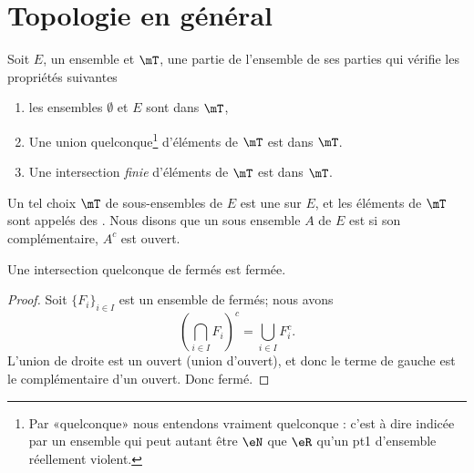 
					\section{Topologie en général}

\begin{definition}		\label{DefTopologieGene}
Soit $E$, un ensemble et $\mT$, une partie de l'ensemble de ses parties qui vérifie les propriétés suivantes
\begin{enumerate}

\item
les ensembles $\emptyset$ et $E$ sont dans $\mT$,

\item
    Une union quelconque\footnote{Par «quelconque» nous entendons vraiment quelconque : c'est à dire indicée par un ensemble qui peut autant être \( \eN\) que \( \eR\) qu'un pt1 d'ensemble réellement violent.} d'éléments de \( \mT\) est dans \( \mT\).
\item
    Une intersection \emph{finie} d'éléments de \( \mT\) est dans \( \mT\).

\end{enumerate}
Un tel choix $\mT$ de sous-ensembles de $E$ est une   sur $E$, et les éléments de $\mT$ sont appelés des . Nous disons que un sous ensemble $A$ de $E$ est  si son complémentaire, $A^c$ est ouvert.
\end{definition}

\begin{lemma}   \label{LemQYUJwPC}
    Une intersection quelconque de fermés est fermée.
\end{lemma}

\begin{proof}
    Soit \( \{ F_i \}_{i\in I} \) est un ensemble de fermés; nous avons
    \begin{equation}
        \left( \bigcap_{i\in I}F_i \right)^c=\bigcup_{i\in I}F_i^c.
    \end{equation}
    L'union de droite est un ouvert (union d'ouvert), et donc le terme de gauche est le complémentaire d'un ouvert. Donc fermé.
\end{proof}

